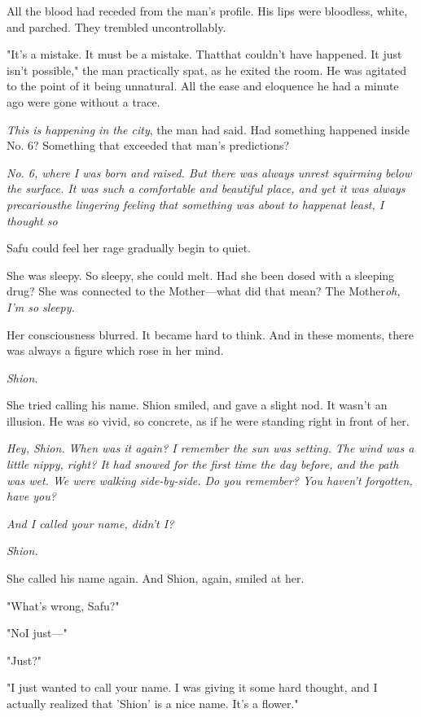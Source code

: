 All the blood had receded from the man's profile. His lips were
bloodless, white, and parched. They trembled uncontrollably.

"It's a mistake. It must be a mistake. That\el that couldn't have
happened. It just isn't possible," the man practically spat, as he
exited the room. He was agitated to the point of it being unnatural. All
the ease and eloquence he had a minute ago were gone without a trace.

\emph{This is happening in the city}, the man had said. Had something happened
inside No. 6? Something that exceeded that man's predictions\el ?

\emph{No. 6, where I was born and raised. But there was always unrest
squirming below the surface. It was such a comfortable and beautiful
place, and yet it was always precarious\el the lingering feeling that
something was about to happen\el at least, I thought so\el }

Safu could feel her rage gradually begin to quiet.

She was sleepy. So sleepy, she could melt. Had she been dosed with a
sleeping drug? She was connected to the Mother---what did that mean? The
Mother\el \emph{oh, I'm so sleepy.}

Her consciousness blurred. It became hard to think. And in these
moments, there was always a figure which rose in her mind.

\emph{Shion.}

She tried calling his name. Shion smiled, and gave a slight nod. It
wasn't an illusion. He was so vivid, so concrete, as if he were standing
right in front of her.

\emph{Hey, Shion. When was it again? I remember the sun was setting. The wind
was a little nippy, right? It had snowed for the first time the day
before, and the path was wet. We were walking side-by-side. Do you
remember? You haven't forgotten, have you?}

\emph{And I called your name, didn't I?}

\emph{Shion.}

\myspace

She called his name again. And Shion, again, smiled at her.

"What's wrong, Safu?"

"No\el I just---"

"Just?"

"I just wanted to call your name. I was giving it some hard thought, and
I actually realized that 'Shion' is a nice name. It's a flower."

